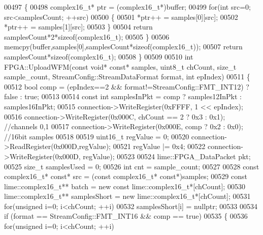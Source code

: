 \begin{DoxyCode}
{{{{{00497     \{
00498         complex16_t* ptr = (complex16_t*)buffer;
00499         \textcolor{keywordflow}{for}(\textcolor{keywordtype}{int} src=0; src<samplesCount; ++src)
00500         \{
00501             *ptr++ = samples[0][src];
00502             *ptr++ = samples[1][src];
00503         \}
00504         \textcolor{keywordflow}{return} samplesCount*2*\textcolor{keyword}{sizeof}(complex16_t);
00505     \}
00506     memcpy(buffer,samples[0],samplesCount*\textcolor{keyword}{sizeof}(complex16_t));
00507     \textcolor{keywordflow}{return} samplesCount*\textcolor{keyword}{sizeof}(complex16_t);
00508 \}
00509 
00510 \textcolor{keywordtype}{int} FPGA::UploadWFM(\textcolor{keyword}{const} \textcolor{keywordtype}{void}* \textcolor{keyword}{const}* samples, uint8\_t chCount, \textcolor{keywordtype}{size\_t} 
      sample_count, StreamConfig::StreamDataFormat format, \textcolor{keywordtype}{int} epIndex)
00511 \{
00512     \textcolor{keywordtype}{bool} comp = (epIndex==2 && format!=StreamConfig::FMT\_INT12) ? \textcolor{keyword}{false} : \textcolor{keyword}{true};
00513 
00514     \textcolor{keyword}{const} \textcolor{keywordtype}{int} samplesInPkt = comp ? samples12InPkt : samples16InPkt;
00515     connection->WriteRegister(0xFFFF, 1 << epIndex);
00516     connection->WriteRegister(0x000C, chCount == 2 ? 0x3 : 0x1); \textcolor{comment}{//channels 0,1}
00517     connection->WriteRegister(0x000E, comp ? 0x2 : 0x0); \textcolor{comment}{//16bit samples}
00518 
00519     uint16\_t regValue = 0;
00520     connection->ReadRegister(0x000D,regValue);
00521     regValue |= 0x4;
00522     connection->WriteRegister(0x000D, regValue);
00523 
00524     lime::FPGA_DataPacket pkt;
00525     \textcolor{keywordtype}{size\_t} samplesUsed = 0;
00526     \textcolor{keywordtype}{int} cnt = sample_count;
00527 
00528     \textcolor{keyword}{const} complex16_t* \textcolor{keyword}{const}* src = (\textcolor{keyword}{const} complex16_t* \textcolor{keyword}{const}*)samples;
00529     \textcolor{keyword}{const} lime::complex16_t** batch = \textcolor{keyword}{new} \textcolor{keyword}{const} lime::complex16_t*[chCount];
00530     lime::complex16_t** samplesShort = \textcolor{keyword}{new} lime::complex16_t*[chCount];
00531     \textcolor{keywordflow}{for}(\textcolor{keywordtype}{unsigned} i=0; i<chCount; ++i)
00532         samplesShort[i] = \textcolor{keyword}{nullptr};
00533 
00534     \textcolor{keywordflow}{if} (format == StreamConfig::FMT\_INT16 && comp == \textcolor{keyword}{true})
00535     \{
00536         \textcolor{keywordflow}{for}(\textcolor{keywordtype}{unsigned} i=0; i<chCount; ++i)
}}}}}
\end{DoxyCode}
